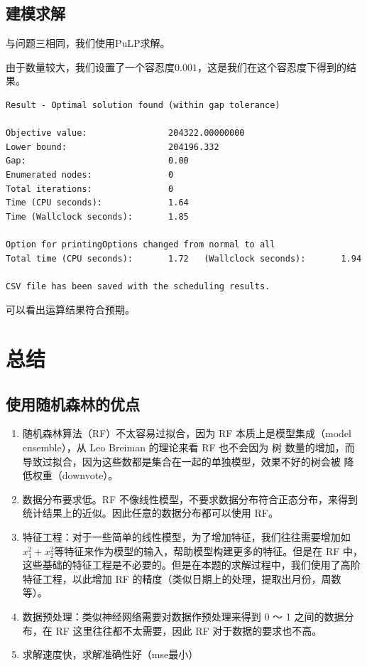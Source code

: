 \documentclass[UTF8]{article}%
\begin{document}
\subsection{建模求解}
与问题三相同，我们使用PuLP求解。

由于数量较大，我们设置了一个容忍度\(0.001\)，这是我们在这个容忍度下得到的结果。
\begin{lstlisting}
Result - Optimal solution found (within gap tolerance)

Objective value:                204322.00000000
Lower bound:                    204196.332
Gap:                            0.00
Enumerated nodes:               0
Total iterations:               0
Time (CPU seconds):             1.64
Time (Wallclock seconds):       1.85

Option for printingOptions changed from normal to all
Total time (CPU seconds):       1.72   (Wallclock seconds):       1.94

CSV file has been saved with the scheduling results.
\end{lstlisting}

可以看出运算结果符合预期。


\clearpage
\section{总结}
\subsection{使用随机森林的优点}
\begin{enumerate}
    \item 随机森林算法（RF）不太容易过拟合，因为 RF 本质上是模型集成（model ensemble），从 Leo Breiman 的理论来看 RF 也不会因为 树 数量的增加，而导致过拟合，因为这些数都是集合在一起的单独模型，效果不好的树会被 降低权重（downvote）。\cite{2001Random}
    \item 数据分布要求低。RF 不像线性模型，不要求数据分布符合正态分布，来得到统计结果上的近似。因此任意的数据分布都可以使用 RF。
    \item 特征工程：对于一些简单的线性模型，为了增加特征，我们往往需要增加如$ x_1^2 + x_2^2 $等特征来作为模型的输入，帮助模型构建更多的特征。但是在 RF 中，这些基础的特征工程是不必要的。但是在本题的求解过程中，我们使用了高阶特征工程，以此增加 RF 的精度（类似日期上的处理，提取出月份，周数等）。
    \item 数据预处理：类似神经网络需要对数据作预处理来得到 0 ～ 1 之间的数据分布，在 RF 这里往往都不太需要，因此 RF 对于数据的要求也不高。
    \item 求解速度快，求解准确性好（mse最小）
\end{enumerate}
\end{document}
